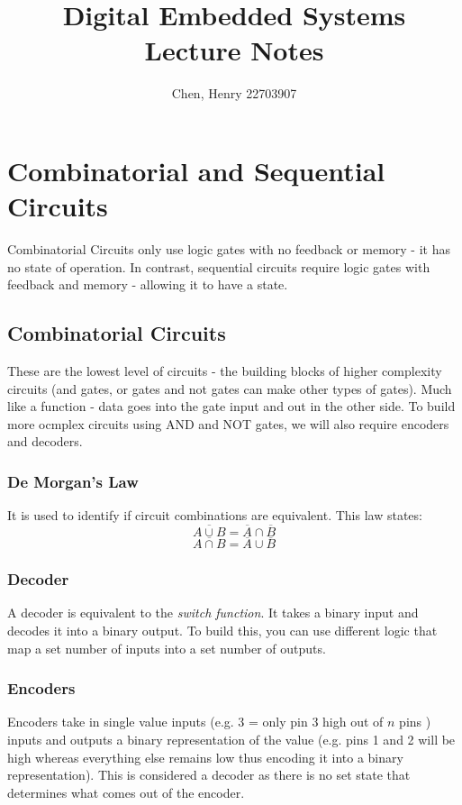 \documentclass[]{report}
\author{Chen, Henry 22703907}
\title{
        \textbf{Digital Embedded Systems} \\
        Lecture Notes
    }
\begin{document}
\maketitle
\tableofcontents

\chapter{Combinatorial and Sequential Circuits}
Combinatorial Circuits only use logic gates with no feedback or memory - it has no state of operation. In contrast, sequential circuits require logic gates with feedback and memory - allowing it to have a state. 

\section{Combinatorial Circuits}
These are the lowest level of circuits - the building blocks of higher complexity circuits (and gates, or gates and not gates can make other types of gates). Much like a function - data goes into the gate input and out in the other side. To build more ocmplex circuits using AND and NOT gates, we will also require encoders and decoders.

\subsection{De Morgan's Law}
It is used to identify if circuit combinations are equivalent. This law states:
\[\overline{A \cup B} = \overline{A} \cap \overline{B} \]
\[\overline{A \cap B} = \overline{A} \cup \overline{B} \]

\subsection{Decoder}
A decoder is equivalent to the \emph{switch function}. It takes a binary input and decodes it into a binary output. To build this, you can use different logic that map a set number of inputs into a set number of outputs.  

\subsection{Encoders}
Encoders take in single value inputs (e.g. 3 = only pin 3 high out of $n$ pins ) inputs and outputs a binary representation of the value (e.g. pins 1 and 2 will be high whereas everything else remains low thus encoding it into a binary representation). This is considered a decoder as there is no set state that determines what comes out of the encoder.
\end{document}
